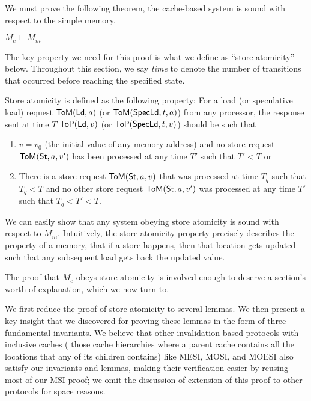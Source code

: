 We must prove the following theorem, \ie{} the cache-based system is sound with
respect to the simple memory.
\begin{theorem}
\label{ccorrect}
$M_c \sqsubseteq M_m$
\end{theorem}

The key property we need for this proof is what we define as
``store atomicity'' below. Throughout this section, we say
\emph{time} to denote the number of transitions that occurred before reaching
the specified state.

\begin{defn}
Store atomicity is defined as the following property:
For a load (or speculative load) request $\mathsf{ToM}(\mathsf{Ld}, a)$ (or $\mathsf{ToM}(\mathsf{Spec}\mathsf{Ld}, t, a)$)
from any processor, the response sent at time $T$
$\mathsf{ToP}(\mathsf{Ld}, v)$ (or $\mathsf{ToP}(\mathsf{Spec}\mathsf{Ld}, t, v)$) should be such that
\begin{enumerate}
\item $v = v_0$ (the initial value of any memory address) and no store
  request $\mathsf{ToM}(\mathsf{St}, a, v')$ has been processed at any time $T'$ such
  that $T' < T$ or
\item There is a store request $\mathsf{ToM}(\mathsf{St}, a, v)$ that was processed at time $T_q$ such that
$T_q < T$ and no other store
request $\mathsf{ToM}(\mathsf{St}, a, v')$ was processed at any time $T'$ such that $T_q < T' < T$.
\end{enumerate}
\label{sa}
\end{defn}

We can easily show that any system obeying store atomicity
is sound with respect to $M_m$. Intuitively, the store atomicity
property precisely describes the property of a memory, \viz{} that if a store
happens, then that location gets updated such that any subsequent load gets
back the updated value.

The proof that $M_c$ obeys store atomicity is involved enough to deserve a
section's worth of explanation, which we now turn to.

We first reduce the proof of store atomicity to several lemmas. We then
present a key insight that we discovered for proving these lemmas in the form
of three fundamental invariants. We believe that other invalidation-based
protocols with inclusive caches (\ie{} those cache hierarchies where a parent
cache contains all the locations that any of its children contains) like MESI,
MOSI, and MOESI also satisfy our invariants and lemmas, making their verification
easier by reusing most of our MSI proof; we omit the discussion of extension of
this proof to other protocols for space reasons.

